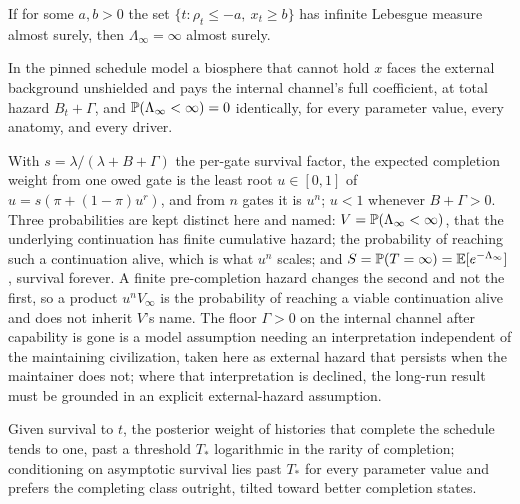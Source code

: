 \begin{corollary}\label{imp:overlap}
If for some $a,b>0$ the set $\{t:\rho_t\le-a,\ x_t\ge b\}$ has infinite
Lebesgue measure almost surely, then $\Lambda_\infty=\infty$ almost
surely.
\end{corollary}

\begin{proposition}\label{imp:gating}
In the pinned schedule model a biosphere that cannot hold $x$ faces the
external background unshielded and pays the internal channel's full
coefficient, at total hazard $B_t+\Gamma$, and $\mathbb{P}(\Lambda_\infty<\infty)=0$
identically, for every parameter value, every anatomy, and every
driver.
\end{proposition}

\begin{proposition}\label{imp:fixedpoint}
With $s=\lambda/(\lambda+B+\Gamma)$ the per-gate survival factor, the
expected completion weight from one owed gate is the least root
$u\in[0,1]$ of $u=s(\pi+(1-\pi)u^{r})$, and from $n$ gates it is $u^{n}$; $u<1$ whenever $B+\Gamma>0$. Three probabilities are kept distinct here and named: $V = \mathbb{P}(\Lambda_\infty < \infty)$, that the underlying continuation has finite cumulative hazard; the probability of reaching such a continuation alive, which is what $u^{n}$ scales; and $S = \mathbb{P}(T = \infty) = \mathbb{E}[e^{-\Lambda_\infty}]$, survival forever. A finite pre-completion hazard changes the second and not the first, so a product $u^{n}V_\infty$ is the probability of reaching a viable continuation alive and does not inherit $V$'s name. The floor $\Gamma > 0$ on the internal channel after capability is gone is a model assumption needing an interpretation independent of the maintaining civilization, taken here as external hazard that persists when the maintainer does not; where that interpretation is declined, the long-run result must be grounded in an explicit external-hazard assumption.
\end{proposition}

\begin{proposition}\label{imp:threshold}
Given survival to $t$, the posterior weight of histories that complete
the schedule tends to one, past a threshold $T_\ast$ logarithmic in the
rarity of completion; conditioning on asymptotic survival lies past
$T_\ast$ for every parameter value and prefers the completing class
outright, tilted toward better completion states.
\end{proposition}

